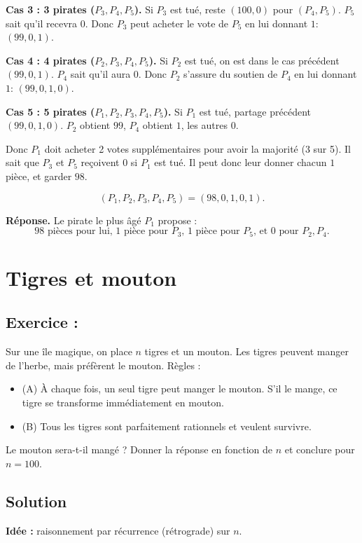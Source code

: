 \medskip
\textbf{Cas 3 : 3 pirates ($P_3,P_4,P_5$).}  
Si $P_3$ est tué, reste $(100,0)$ pour $(P_4,P_5)$.  
$P_5$ sait qu’il recevra $0$.  
Donc $P_3$ peut acheter le vote de $P_5$ en lui donnant $1$: $(99,0,1)$.

\medskip
\textbf{Cas 4 : 4 pirates ($P_2,P_3,P_4,P_5$).}  
Si $P_2$ est tué, on est dans le cas précédent $(99,0,1)$.  
$P_4$ sait qu’il aura $0$.  
Donc $P_2$ s’assure du soutien de $P_4$ en lui donnant $1$: $(99,0,1,0)$.

\medskip
\textbf{Cas 5 : 5 pirates ($P_1,P_2,P_3,P_4,P_5$).}  
Si $P_1$ est tué, partage précédent $(99,0,1,0)$.  
$P_2$ obtient $99$, $P_4$ obtient $1$, les autres $0$.  

Donc $P_1$ doit acheter 2 votes supplémentaires pour avoir la majorité (3 sur 5).  
Il sait que $P_3$ et $P_5$ reçoivent $0$ si $P_1$ est tué.  
Il peut donc leur donner chacun $1$ pièce, et garder $98$.  

\[
(P_1,P_2,P_3,P_4,P_5) = (98,0,1,0,1).
\]

\medskip
\textbf{Réponse.}  
Le pirate le plus âgé $P_1$ propose :  
\[
\boxed{98 \text{ pièces pour lui, 1 pièce pour $P_3$, 1 pièce pour $P_5$, et 0 pour $P_2,P_4$}.}
\]



\section{Tigres et mouton}

\subsection*{Exercice :}

\begin{exerciseBox}
Sur une île magique, on place $n$ tigres et un mouton. Les tigres peuvent manger de l’herbe, mais préfèrent le mouton. Règles :
\begin{itemize}
  \item (A) À chaque fois, un seul tigre peut manger le mouton. S’il le mange, ce tigre se transforme immédiatement en mouton.
  \item (B) Tous les tigres sont parfaitement rationnels et veulent survivre.
\end{itemize}
Le mouton sera-t-il mangé ? Donner la réponse en fonction de $n$ et conclure pour $n=100$.
\end{exerciseBox}

\subsection*{Solution}
\textbf{Idée :} raisonnement par récurrence (rétrograde) sur $n$.

